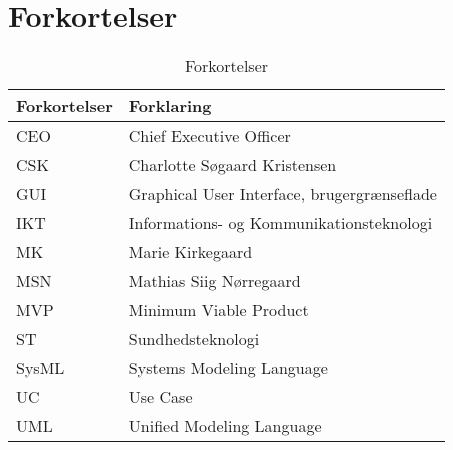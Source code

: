 \chapter{Forkortelser}
\begin{table}[h]
\centering
\begin{tabular}{|l| p{}|}
\hline
\textbf{Forkortelser} &  \textbf{Forklaring} \\\hline
CEO & Chief Executive Officer \\\hline
CSK & Charlotte Søgaard Kristensen \\\hline
GUI & Graphical User Interface, brugergrænseflade \\\hline
IKT & Informations- og Kommunikationsteknologi \\\hline
MK & Marie Kirkegaard \\\hline
MSN & Mathias Siig Nørregaard \\\hline
MVP & Minimum Viable Product  \\\hline
ST  & Sundhedsteknologi \\\hline
SysML & Systems Modeling Language\\\hline
UC  & Use Case \\\hline
UML & Unified Modeling Language \\\hline
\end{tabular}
\caption{Forkortelser}
\end{table}

\vspace{5cm}